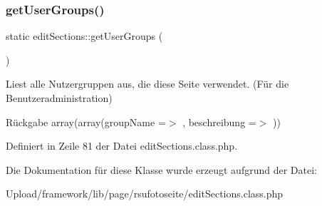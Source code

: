 \subsubsection{\texorpdfstring{get\+User\+Groups()}{getUserGroups()}}
{\footnotesize\ttfamily static edit\+Sections\+::get\+User\+Groups (\begin{DoxyParamCaption}{ }\end{DoxyParamCaption})\hspace{0.3cm}{\ttfamily [static]}}

Liest alle Nutzergruppen aus, die diese Seite verwendet. (Für die Benutzeradministration) \begin{DoxyReturn}{Rückgabe}
array(array(\textquotesingle{}group\+Name\textquotesingle{} =$>$ \textquotesingle{}\textquotesingle{}, \textquotesingle{}beschreibung\textquotesingle{} =$>$ \textquotesingle{}\textquotesingle{})) 
\end{DoxyReturn}


Definiert in Zeile 81 der Datei edit\+Sections.\+class.\+php.



Die Dokumentation für diese Klasse wurde erzeugt aufgrund der Datei\+:\begin{DoxyCompactItemize}
\item 
Upload/framework/lib/page/rsufotoseite/edit\+Sections.\+class.\+php\end{DoxyCompactItemize}
